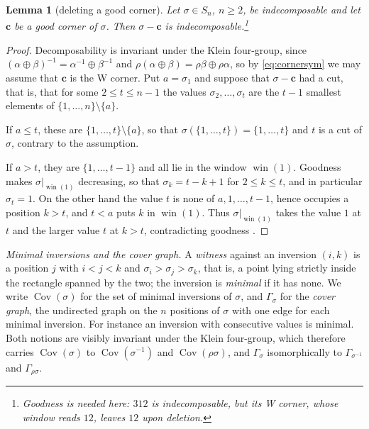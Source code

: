 \documentclass[12pt]{article}
\def\xspace{ }%
\newtheorem{lemma}[lemma]{Lemma}
\theoremstyle{definition}
\newcommand{\good}{good\xspace}
\newcommand{\goodness}{goodness\xspace}
\newcommand{\Goodness}{Goodness\xspace}
\newcommand{\wo}{w_0}                 %
\newcommand{\rc}{\rho}                %
\newcommand{\win}{\operatorname{win}}     %
\newcommand{\Cov}{\operatorname{Cov}}  %
\newcommand{\Wcr}{W\xspace}    %
\newcommand{\crn}{\mathbf{c}}              %
\newcommand{\cgr}{\Gamma}                 %
\begin{document}
\begin{lemma}[deleting a \good corner]\label{lem:cornerindec}
Let $\sigma \in S_n$, $n \ge 2$, be indecomposable and let $\crn$ be a
\good corner of $\sigma$. Then $\sigma - \crn$ is indecomposable.\footnote{\Goodness is needed here: $312$ is indecomposable, but its \Wcr corner,
whose window reads $12$, leaves $12$ upon deletion.}
\end{lemma}

\begin{proof}
Decomposability is invariant under the Klein four-group, since
$(\alpha\oplus\beta)^{-1} = \alpha^{-1}\oplus\beta^{-1}$ and
$\rc(\alpha\oplus\beta) = \rc\beta\oplus\rc\alpha$, so by
\eqref{eq:cornersym} we may assume that $\crn$ is the \Wcr corner. Put $a
= \sigma_1$ and suppose that $\sigma-\crn$ had a cut, that is, that for
some $2 \le t \le n-1$ the values $\sigma_2,\dots,\sigma_t$ are the $t-1$
smallest elements of $\{1,\dots,n\}\setminus\{a\}$.

If $a \le t$, these are $\{1,\dots,t\}\setminus\{a\}$, so that
$\sigma(\{1,\dots,t\}) = \{1,\dots,t\}$ and $t$ is a cut of $\sigma$,
contrary to the assumption.

If $a > t$, they are $\{1,\dots,t-1\}$ and all lie in the window $\win(1)$.
\Goodness makes $\sigma|_{\win(1)}$ decreasing, so that $\sigma_k = t-k+1$
for $2 \le k \le t$, and in particular $\sigma_t = 1$. On the other hand
the value $t$ is none of $a,1,\dots,t-1$, hence occupies a position $k >
t$, and $t < a$ puts $k$ in $\win(1)$. Thus $\sigma|_{\win(1)}$ takes the value
$1$ at $t$ and the larger value $t$ at $k > t$, contradicting \goodness.
\end{proof}



\emph{Minimal inversions and the cover graph.} A \emph{witness} against
an inversion $(i,k)$ is a position $j$ with $i<j<k$ and $\sigma_i >
\sigma_j > \sigma_k$, that is, a point lying strictly inside the
rectangle spanned by the two; the inversion is \emph{minimal} if it has
none. We write $\Cov(\sigma)$ for the set of minimal inversions of
$\sigma$, and $\cgr_\sigma$ for the \emph{cover graph}, the undirected
graph on the $n$ positions of $\sigma$ with one edge for each minimal
inversion. For instance an inversion with consecutive values is minimal. Both notions are visibly invariant under the Klein
four-group, which therefore carries $\Cov(\sigma)$ to $\Cov(\sigma^{-1})$
and $\Cov(\rc\sigma)$, and $\cgr_\sigma$ isomorphically to
$\cgr_{\sigma^{-1}}$ and $\cgr_{\rc\sigma}$.
\end{document}
